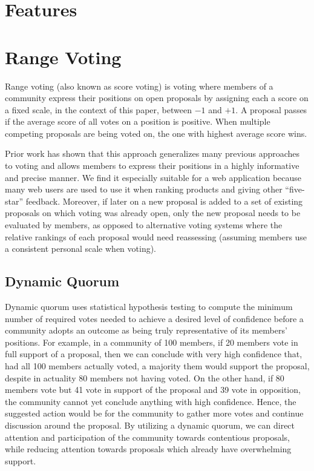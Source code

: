 \documentclass{sigchi}
\begin{document}
\section{Features}

\section{Range Voting}

Range voting (also known as score voting) is voting where members of a community express their positions on open proposals by assigning
each a score on a fixed scale, in the context of this paper, between $-1$ and $+1$.
A proposal passes if the average score of all votes on a position is positive.
When multiple competing proposals are being voted on, the one with highest average score wins.

Prior work has shown that this approach generalizes many previous approaches to voting and allows members to express their
positions in a highly informative and precise manner.
We find it especially suitable for a web application because many web users are used to use it when ranking products
and giving other ``five-star'' feedback.
Moreover, if later on a new proposal is added to a set of existing proposals on which voting was already open, only the
new proposal needs to be evaluated by members, as opposed to alternative voting systems where the relative rankings of
each proposal would need reassessing (assuming members use a consistent personal scale when voting).

\subsection{Dynamic Quorum}


Dynamic quorum uses statistical hypothesis testing to compute the minimum number of required votes needed
to achieve a desired level of confidence before a community adopts an outcome as being truly representative of
its members' positions.
For example, in a community of 100 members, if 20 members vote in full support of a proposal, then we can conclude
with very high confidence that, had all 100 members actually voted, a majority them would support the proposal,
despite in actuality 80 members not having voted.
On the other hand, if 80 members vote but 41 vote in support of the proposal and 39 vote in opposition,
the community cannot yet conclude anything with high confidence.
Hence, the suggested action would be for the community to gather more votes and continue discussion around the proposal.
By utilizing a dynamic quorum, we can direct attention and participation of the community towards contentious proposals,
while reducing attention towards proposals which already have overwhelming support.
\end{document}
